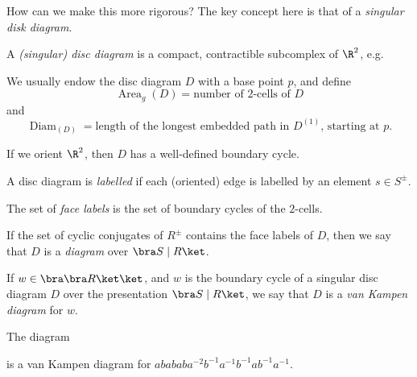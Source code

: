 \documentclass[a4paper]{article}
\DeclareMathOperator\Area{Area}
\DeclareMathOperator\Diam{Diam}
\begin{document}
How can we make this more rigorous? The key concept here is that of a \emph{singular disk diagram}.

\begin{defi}
  A \emph{(singular) disc diagram} is a compact, contractible subcomplex of $\R^2$, e.g.
  \begin{center}
  \end{center}
  We usually endow the disc diagram $D$ with a base point $p$, and define
  \[
    \Area_g(D) = \text{number of $2$-cells of $D$}
  \]
  and
  \[
    \Diam_(D) = \text{length of the longest embedded path in $D^{(1)}$, starting at $p$}.
  \]
\end{defi}
If we orient $\R^2$, then $D$ has a well-defined boundary cycle. %

A disc diagram is \emph{labelled} if each (oriented) edge is labelled by an element $s \in S^{\pm}$.

The set of \emph{face labels} is the set of boundary cycles of the $2$-cells.

If the set of cyclic conjugates of $R^{\pm}$ contains the face labels of $D$, then we say that $D$ is a \emph{diagram} over $\bra S \mid R\ket$.

\begin{defi}
  If $w \in \bra \bra R \ket \ket$, and $w$ is the boundary cycle of a singular disc diagram $D$ over the presentation $\bra S \mid R\ket$, we say that $D$ is a \emph{van Kampen diagram} for $w$.
\end{defi}
\begin{eg}
  The diagram
  \begin{center}
  \end{center}
  is a van Kampen diagram for $abababa^{-2}b^{-1} a^{-1}b^{-1}ab^{-1}a^{-1}$.
\end{eg}
\end{document}
